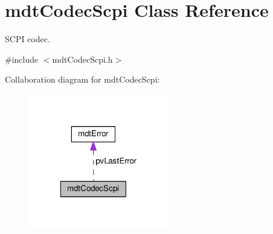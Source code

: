 \hypertarget{classmdt_codec_scpi}{\section{mdt\-Codec\-Scpi Class Reference}
\label{classmdt_codec_scpi}
}


S\-C\-P\-I codec.  




{\ttfamily \#include $<$mdt\-Codec\-Scpi.\-h$>$}



Collaboration diagram for mdt\-Codec\-Scpi\-:\nopagebreak
\begin{figure}[H]
\begin{center}
\leavevmode
\includegraphics[width=174pt]{classmdt_codec_scpi__coll__graph}
\end{center}
\end{figure}
